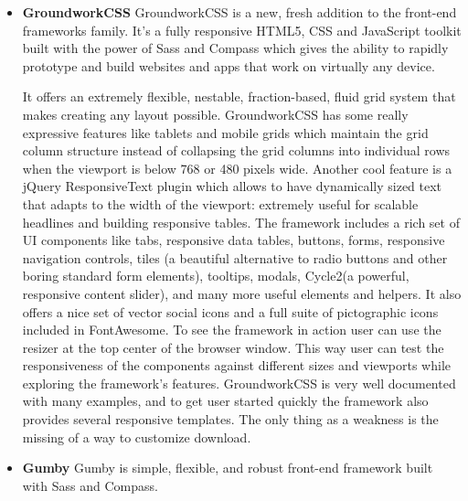 \begin{itemize}
	\item \textbf{GroundworkCSS}
	\newline
	GroundworkCSS is a new, fresh addition to the front-end frameworks family. It’s a fully responsive HTML5, CSS and JavaScript toolkit built with the power of Sass and Compass which gives the ability to rapidly prototype and build websites and apps that work on virtually any device.

	It offers an extremely flexible, nestable, fraction-based, fluid grid system that makes creating any layout possible. GroundworkCSS has some really expressive features like tablets and mobile grids which maintain the grid column structure instead of collapsing the grid columns into individual rows when the viewport is below 768 or 480 pixels wide. Another cool feature is a jQuery ResponsiveText plugin which allows to have dynamically sized text that adapts to the width of the viewport: extremely useful for scalable headlines and building responsive tables.
	The framework includes a rich set of UI components like tabs, responsive data tables, buttons, forms, responsive navigation controls, tiles (a beautiful alternative to radio buttons and other boring standard form elements), tooltips, modals, Cycle2(a powerful, responsive content slider), and many more useful elements and helpers. It also offers a nice set of vector social icons and a full suite of pictographic icons included in FontAwesome. To see the framework in action user can use the resizer at the top center of the browser window. This way user can test the responsiveness of the components against different sizes and viewports while exploring the framework’s features. GroundworkCSS is very well documented with many examples, and to get user started quickly the framework also provides several responsive templates. The only thing as a weakness is the missing of a way to customize download.

	\item \textbf{Gumby}            
	\newline
	Gumby is simple, flexible, and robust front-end framework built with Sass and Compass.


\end{itemize}
